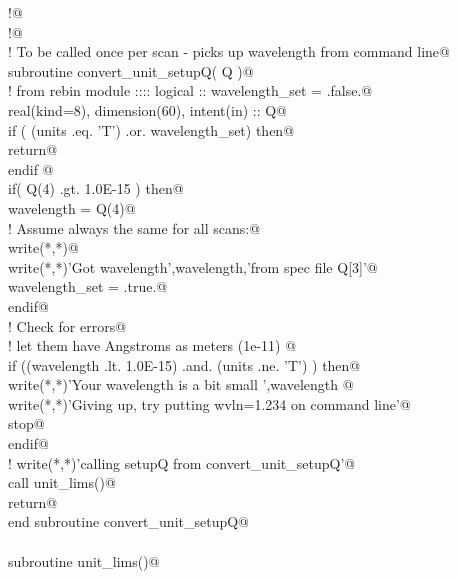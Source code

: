 \documentclass[10pt,a4paper,notitlepage]{article}
\begin{document}
\begin{flushleft}
\begin{minipage}{\linewidth}
\begin{list}{}{}
\mbox{}\verb@!@\\
\mbox{}\verb@!@\\
\mbox{}\verb@! To be called once per scan - picks up wavelength from command line@\\
\mbox{}\verb@      subroutine convert_unit_setupQ( Q )@\\
\mbox{}\verb@! from rebin module :::: logical :: wavelength_set = .false.@\\
\mbox{}\verb@      real(kind=8), dimension(60), intent(in) :: Q@\\
\mbox{}\verb@      if ( (units .eq. 'T') .or. wavelength_set) then@\\
\mbox{}\verb@         return@\\
\mbox{}\verb@      endif @\\
\mbox{}\verb@      if( Q(4) .gt. 1.0E-15 ) then@\\
\mbox{}\verb@          wavelength = Q(4)@\\
\mbox{}\verb@! Assume always the same for all scans:@\\
\mbox{}\verb@          write(*,*)@\\
\mbox{}\verb@          write(*,*)'Got wavelength',wavelength,'from spec file Q[3]'@\\
\mbox{}\verb@          wavelength_set = .true.@\\
\mbox{}\verb@      endif@\\
\mbox{}\verb@! Check for errors@\\
\mbox{}\verb@! let them have Angstroms as meters (1e-11) @\\
\mbox{}\verb@      if ((wavelength .lt. 1.0E-15) .and. (units .ne. 'T') ) then@\\
\mbox{}\verb@        write(*,*)'Your wavelength is a bit small ',wavelength @\\
\mbox{}\verb@        write(*,*)'Giving up, try putting wvln=1.234 on command line'@\\
\mbox{}\verb@        stop@\\
\mbox{}\verb@      endif@\\
\mbox{}\verb@!      write(*,*)'calling setupQ from convert_unit_setupQ'@\\
\mbox{}\verb@      call unit_lims()@\\
\mbox{}\verb@      return@\\
\mbox{}\verb@      end subroutine convert_unit_setupQ@\\
\mbox{}\verb@@\\
\mbox{}\verb@      subroutine unit_lims()@\\

\end{list}
\end{minipage}
\end{flushleft}
\end{document}
